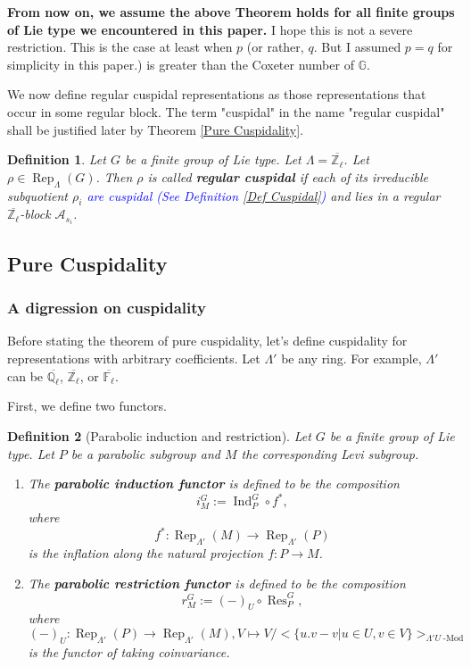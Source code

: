 \documentclass{article}
\newcommand{\blue}[1]{\textcolor{blue}{#1}}
\newtheorem{definition}{Definition}
\DeclareMathOperator{\Ind}{\operatorname{Ind}}
\newcommand{\Res}{\operatorname{Res}}
\newcommand{\Rep}{\operatorname{Rep}}
\newcommand{\Modl}{\operatorname{-Mod}}
\begin{document}
	\textbf{From now on, we assume the above Theorem holds for all finite groups of Lie type we encountered in this paper.} I hope this is not a severe restriction. This is the case at least when $p$ (or rather, $q$. But I assumed $p=q$ for simplicity in this paper.) is greater than the Coxeter number of $\mathbb{G}$.
	
	We now define regular cuspidal representations as those representations that occur in some regular block. The term "cuspidal" in the name "regular cuspidal" shall be justified later by Theorem \ref{Pure Cuspidality}.
	
	\begin{definition}\label{Def regular cuspidal}
		Let $G$ be a finite group of Lie type. Let $\Lambda=\overline{\mathbb{Z}_{\ell}}$. Let $\rho \in \Rep_{\Lambda}(G)$. Then $\rho$ is called \textbf{regular cuspidal} if each of its irreducible subquotient $\rho_i$ \blue{are cuspidal (See Definition \ref{Def Cuspidal})} and lies in a regular $\overline{\mathbb{Z}_{\ell}}$-block $\mathcal{A}_{s_i}$.
	\end{definition}
	
	
	
	
	\subsection{Pure Cuspidality}
	
	\subsubsection{A digression on cuspidality}
	
	Before stating the theorem of pure cuspidality, let's define cuspidality for representations with arbitrary coefficients. Let $\Lambda'$ be any ring. For example, $\Lambda'$ can be $\overline{\mathbb{Q}_{\ell}}$, $\overline{\mathbb{Z}_{\ell}}$, or $\overline{\mathbb{F}_{\ell}}$.
	
	First, we define two functors.
	
	\begin{definition}[Parabolic induction and restriction] 
		Let $G$ be a finite group of Lie type. Let $P$ be a parabolic subgroup and $M$ the corresponding Levi subgroup.
		\begin{enumerate}
			\item The \textbf{parabolic induction functor} is defined to be the composition 
			$$i_M^G:= \Ind_P^G \circ f^*,$$ where 
			$$f^*: \Rep_{\Lambda'}(M) \to \Rep_{\Lambda'}(P)$$
			is the inflation along the natural projection $f: P \to M$. 
			\item The \textbf{parabolic restriction functor} is defined to be the composition 
			$$r_M^G:= (-)_U \circ \Res_P^G,$$ where 
			$$(-)_U: \Rep_{\Lambda'}(P) \to \Rep_{\Lambda'}(M), V \mapsto V/<\{u.v-v | u \in U, v \in V\}>_{\Lambda'U\Modl}$$
			is the functor of taking coinvariance.
		\end{enumerate}
	\end{definition}
	
\end{document}
